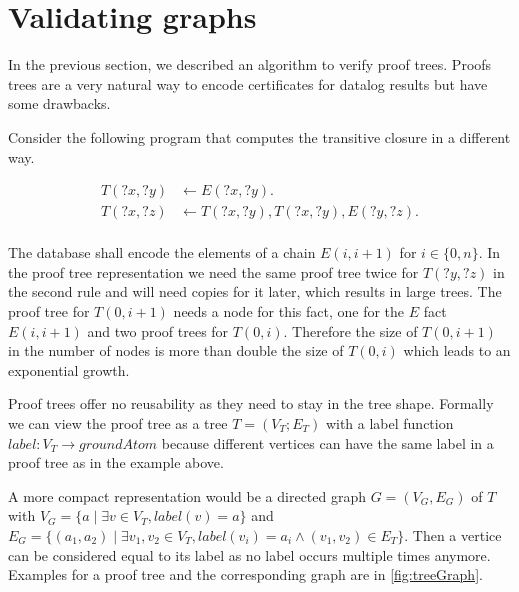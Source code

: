 \section{Validating graphs}\label{sec:valGraph}

In the previous section, we described an algorithm to verify proof trees. Proofs trees are a very natural way to encode certificates for datalog results but have some drawbacks. 

\begin{example}\label{ex:treeGraph}
    Consider the following program that computes the transitive closure in a different way.

    \begin{equation}
        \begin{split}
            T(?x,?y) &\leftarrow E(?x,?y). \\
            T(?x,?z) &\leftarrow T(?x, ?y), T(?x, ?y), E(?y, ?z). \\
        \end{split}
    \end{equation}

    The database shall encode the elements of a chain $E(i, i+1)$ for $i \in \{0, n\}$. In the proof tree representation we need the same proof tree twice for $T(?y, ?z)$ in the second rule and will need copies for it later, which results in large trees. The proof tree for $T(0, i+1)$ needs a node for this fact, one for the $E$ fact $E(i, i+1)$ and two proof trees for $T(0, i)$. Therefore the size of $T(0, i+1)$ in the number of nodes is more than double the size of $T(0, i)$ which leads to an exponential growth.
\end{example}

Proof trees offer no reusability as they need to stay in the tree shape. Formally we can view the proof tree as a tree $T= (V_T;E_T)$ with a label function $label: V_T \to groundAtom$ because different vertices can have the same label in a proof tree as in the example above.

A more compact representation would be a directed graph $G=(V_G, E_G)$ of $T$  with $V_G = \{a \mid \exists v \in V_T, label(v)=a\}$ and $E_G = \{ (a_1, a_2) \mid \exists v_1, v_2 \in V_T,  label(v_i) = a_i \land (v_1, v_2) \in E_T\}$. Then a vertice can be considered equal to its label as no label occurs multiple times anymore. Examples for a proof tree and the corresponding graph are in \cref{fig:treeGraph}.


